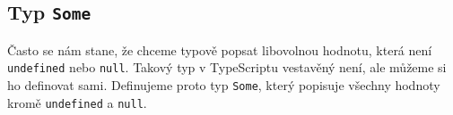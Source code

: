 \subsection[Some]{Typ \texttt{Some}}
\label{subsec:helper-type-some}

Často se nám stane, že chceme typově popsat libovolnou hodnotu, která není \texttt{undefined} nebo \texttt{null}.
Takový typ v TypeScriptu vestavěný není, ale můžeme si ho definovat sami.
Definujeme proto typ \texttt{Some}\cite[line 4]{geometryjs:source:helpers:types:general.ts}, který popisuje všechny hodnoty kromě \texttt{undefined} a \texttt{null}.